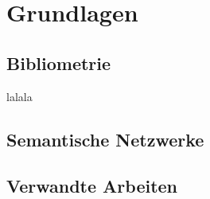 \section{Grundlagen}

\subsection{Bibliometrie}





lalala

\subsection{Semantische Netzwerke}

\subsection{Verwandte Arbeiten}


